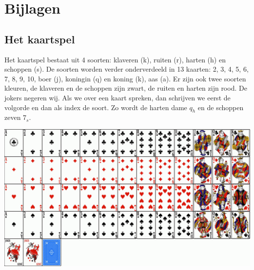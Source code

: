 \documentclass[12pt,twoside]{article}
\begin{document}
\section*{Bijlagen}

\subsection*{Het kaartspel}
Het kaartspel bestaat uit 4 soorten: klaveren (k), ruiten (r), harten (h) en schoppen (s). De soorten worden verder onderverdeeld in 13 kaarten: 2, 3, 4, 5, 6, 7, 8, 9, 10, boer (j), koningin (q) en koning (k), aas (a). Er zijn ook twee soorten kleuren, de klaveren en de schoppen zijn zwart, de ruiten en harten zijn rood. De jokers negeren wij. Als we over een kaart spreken, dan schrijven we eerst de volgorde en dan als index de soort. Zo wordt de harten dame $q_h$ en de schoppen zeven $7_s$.

\includegraphics[width=\textwidth, angle=0]{kaartspel}


\end{document}
